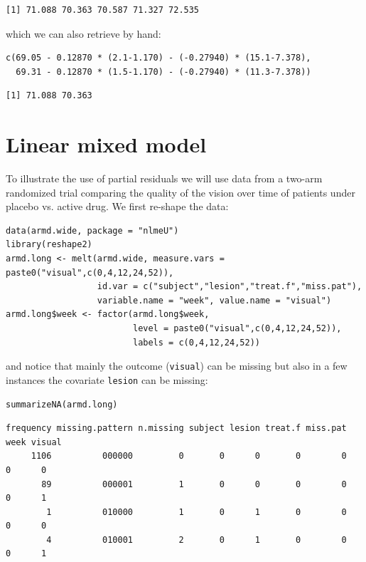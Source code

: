 \documentclass[12pt]{article}
\begin{document}
\begin{verbatim}
[1] 71.088 70.363 70.587 71.327 72.535
\end{verbatim}


which we can also retrieve by hand:
\lstset{language=r,label= ,caption= ,captionpos=b,numbers=none}
\begin{lstlisting}
c(69.05 - 0.12870 * (2.1-1.170) - (-0.27940) * (15.1-7.378),
  69.31 - 0.12870 * (1.5-1.170) - (-0.27940) * (11.3-7.378))
\end{lstlisting}

\begin{verbatim}
[1] 71.088 70.363
\end{verbatim}



\clearpage

\section{Linear mixed model}
\label{sec:orgfdcce79}

To illustrate the use of partial residuals we will use data from a
two-arm randomized trial comparing the quality of the vision over time
of patients under placebo vs. active drug. We first re-shape the data:
\lstset{language=r,label= ,caption= ,captionpos=b,numbers=none}
\begin{lstlisting}
data(armd.wide, package = "nlmeU")
library(reshape2)
armd.long <- melt(armd.wide, measure.vars = paste0("visual",c(0,4,12,24,52)),
                  id.var = c("subject","lesion","treat.f","miss.pat"),
                  variable.name = "week", value.name = "visual")
armd.long$week <- factor(armd.long$week, 
                         level = paste0("visual",c(0,4,12,24,52)),
                         labels = c(0,4,12,24,52))
\end{lstlisting}

and notice that mainly the outcome (\texttt{visual}) can be missing but also
in a few instances the covariate \texttt{lesion} can be missing:
\lstset{language=r,label= ,caption= ,captionpos=b,numbers=none}
\begin{lstlisting}
summarizeNA(armd.long)
\end{lstlisting}

\begin{verbatim}
frequency missing.pattern n.missing subject lesion treat.f miss.pat week visual
     1106          000000         0       0      0       0        0    0      0
       89          000001         1       0      0       0        0    0      1
        1          010000         1       0      1       0        0    0      0
        4          010001         2       0      1       0        0    0      1
\end{verbatim}
\end{document}
